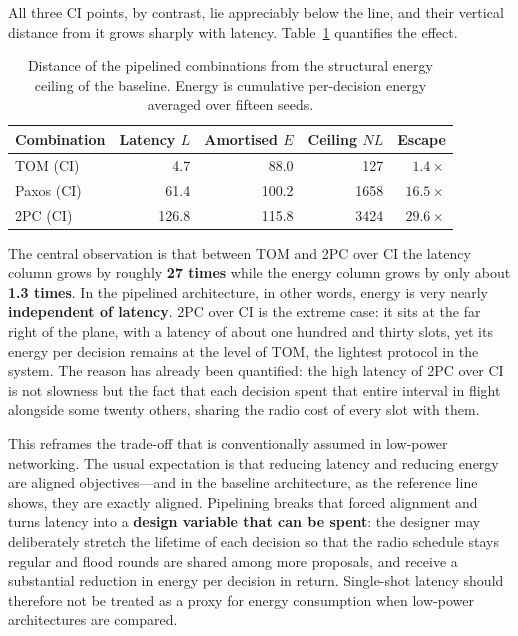 \documentclass[journal]{IEEEtran}
\newcommand{\CI}{CI}                      %
\newcommand{\Nnodes}{N}                   %
\begin{document}
All three \CI{} points, by contrast, lie appreciably below the line, and
their vertical distance from it grows sharply with latency.
Table~\ref{tab:escape} quantifies the effect.

\begin{table}[!t]
\caption{Distance of the pipelined combinations from the structural
energy ceiling of the baseline. Energy is cumulative per-decision energy
averaged over fifteen seeds.}
\label{tab:escape}
\centering
\footnotesize
\setlength{\tabcolsep}{4pt}
\begin{tabular}{@{}lrrrr@{}}
\toprule
\textbf{Combination} & \textbf{Latency $L$} &
\textbf{Amortised $E$} & \textbf{Ceiling $\Nnodes L$} &
\textbf{Escape} \\
\midrule
TOM (\CI)   & 4.7   & 88.0  & 127  & $1.4\times$ \\
Paxos (\CI) & 61.4  & 100.2 & 1658 & $16.5\times$ \\
2PC (\CI)   & 126.8 & 115.8 & 3424 & $29.6\times$ \\
\bottomrule
\end{tabular}
\end{table}

The central observation is that between TOM and 2PC over \CI{} the latency
column grows by roughly \textbf{27 times} while the energy
column grows by only about \textbf{1.3 times}. In the pipelined
architecture, in other words, energy is very nearly
\textbf{independent of latency}. 2PC over \CI{} is the extreme case: it
sits at the far right of the plane, with a latency of about one hundred and
thirty slots, yet its energy per decision remains at the level of TOM,
the lightest protocol in the system. The reason has already been
quantified: the high latency of 2PC over \CI{} is not slowness but the
fact that each decision spent that entire interval in flight alongside
some twenty others, sharing the radio cost of every slot with them.

This reframes the trade-off that is conventionally assumed in low-power
networking. The usual expectation is that reducing latency and reducing
energy are aligned objectives---and in the baseline architecture, as the
reference line shows, they are exactly aligned. Pipelining breaks that
forced alignment and turns latency into a \textbf{design variable that can
be spent}: the designer may deliberately stretch the lifetime of each
decision so that the radio schedule stays regular and flood rounds are
shared among more proposals, and receive a substantial reduction in energy
per decision in return. Single-shot latency should therefore not be
treated as a proxy for energy consumption when low-power architectures are
compared.
\end{document}
